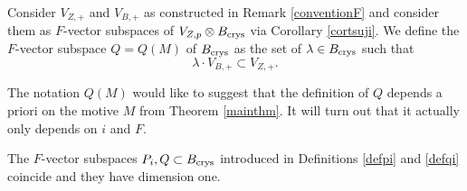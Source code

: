 \begin{definition}
\notready\label{defqi}
Consider $V_{Z,+}$ and $V_{B,+}$ as constructed in Remark \ref{conventionF} and consider them as $F$-vector subspaces of $V_{Z,p}\otimes B_{\textnormal{crys}}$ via Corollary \ref{cortsuji}.
We define the $F$-vector subspace $Q=Q(M)$ of $B_{\textnormal{crys}}$ as the set of $\lambda \in B_{\textnormal{crys}}$ such that
\[\lambda \cdot V_{B,+} \subset V_{Z,+}.\]
\end{definition}
\begin{remark}
\notready
The notation $Q(M)$ would like to suggest that the definition of $Q$ depends a priori on the motive $M$ from Theorem \ref{mainthm}. It will turn out that it actually only depends on $i$ and $F$.
\end{remark}
\begin{proposition}
\notready\label{piqi}
The $F$-vector subspaces $P_i,Q\subset B_{\textnormal{crys}}$ introduced in Definitions \ref{defpi} and \ref{defqi} coincide and they have dimension one.
\end{proposition}

